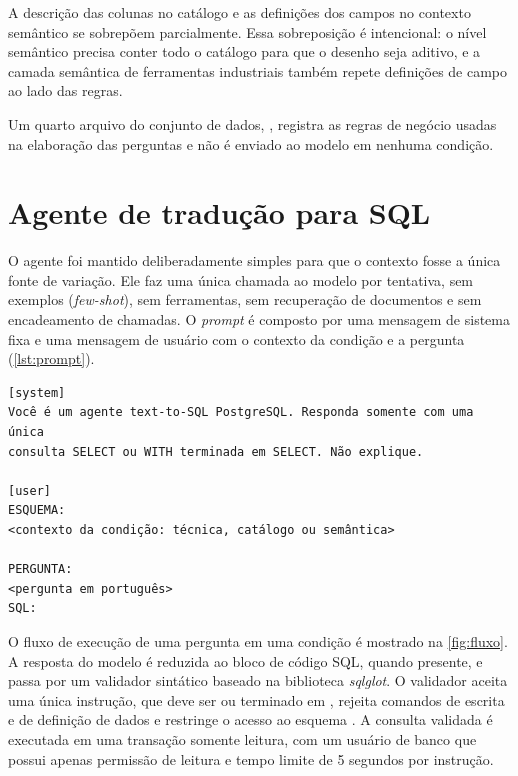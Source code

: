 A descrição das colunas no catálogo e as definições dos campos no contexto
semântico se sobrepõem parcialmente. Essa sobreposição é intencional: o
nível semântico precisa conter todo o catálogo para que o desenho seja
aditivo, e a camada semântica de ferramentas industriais também repete
definições de campo ao lado das regras.

Um quarto arquivo do conjunto de dados, , registra
as regras de negócio usadas na elaboração das perguntas e não é enviado ao
modelo em nenhuma condição.

\section{Agente de tradução para SQL}
\label{sec:agente}

O agente foi mantido deliberadamente simples para que o contexto fosse a
única fonte de variação. Ele faz uma única chamada ao modelo por tentativa,
sem exemplos (\textit{few-shot}), sem ferramentas, sem recuperação de
documentos e sem encadeamento de chamadas. O \textit{prompt} é composto por
uma mensagem de sistema fixa e uma mensagem de usuário com o contexto da
condição e a pergunta (\autoref{lst:prompt}).

\begin{lstlisting}[caption={Estrutura do \textit{prompt} enviado ao modelo},label={lst:prompt}]
[system]
Você é um agente text-to-SQL PostgreSQL. Responda somente com uma única
consulta SELECT ou WITH terminada em SELECT. Não explique.

[user]
ESQUEMA:
<contexto da condição: técnica, catálogo ou semântica>

PERGUNTA:
<pergunta em português>
SQL:
\end{lstlisting}

O fluxo de execução de uma pergunta em uma condição é mostrado na
\autoref{fig:fluxo}. A resposta do modelo é reduzida ao bloco de código
SQL, quando presente, e passa por um validador sintático baseado na
biblioteca \textit{sqlglot}. O validador aceita uma única instrução, que
deve ser  ou  terminado em , rejeita
comandos de escrita e de definição de dados e restringe o acesso ao
esquema . A consulta validada é executada em uma transação
somente leitura, com um usuário de banco que possui apenas permissão de
leitura e tempo limite de 5 segundos por instrução.

